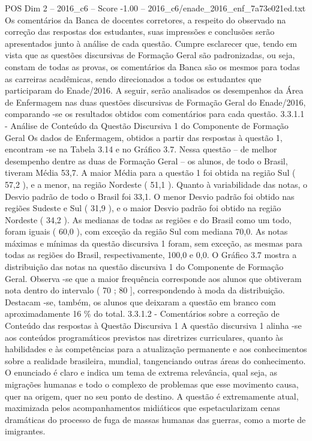 \begin{textsample}{POS Dim 2 – 2016\_c6 – Score -1.00 – 2016\_c6/enade\_2016\_enf\_7a73e021ed.txt}
Os comentários da Banca de docentes corretores, a respeito do observado na correção das respostas dos estudantes, suas impressões e conclusões serão apresentados junto à análise de cada questão.
Cumpre esclarecer que, tendo em vista que as questões discursivas de Formação Geral são padronizadas, ou seja, constam de todas as provas, os comentários da Banca são os mesmos para todas as carreiras acadêmicas, sendo direcionados a todos os estudantes que participaram do Enade/2016.
A seguir, serão analisados os desempenhos da Área de Enfermagem nas duas questões discursivas de Formação Geral do Enade/2016, comparando -se os resultados obtidos com comentários para cada questão. 3.3.1.1 - Análise de Conteúdo da Questão Discursiva 1 do Componente de Formação Geral Os dados de Enfermagem, obtidos a partir das respostas à questão 1, encontram -se na Tabela 3.14 e no Gráfico 3.7.
Nessa questão – de melhor desempenho dentre as duas de Formação Geral – os alunos, de todo o Brasil, tiveram Média 53,7.
A maior Média para a questão 1 foi obtida na região Sul ( 57,2 ), e a menor, na região Nordeste ( 51,1 ).
Quanto à variabilidade das notas, o Desvio padrão de todo o Brasil foi 33,1.
O menor Desvio padrão foi obtido nas regiões Sudeste e Sul ( 31,9 ), e o maior Desvio padrão foi obtido na região Nordeste ( 34,2 ).
As medianas de todas as regiões e do Brasil como um todo, foram iguais ( 60,0 ), com exceção da região Sul com mediana 70,0.
As notas máximas e mínimas da questão discursiva 1 foram, sem exceção, as mesmas para todas as regiões do Brasil, respectivamente, 100,0 e 0,0.
O Gráfico 3.7 mostra a distribuição das notas na questão discursiva 1 do Componente de Formação Geral.
Observa -se que a maior frequência corresponde aos alunos que obtiveram nota dentro do intervalo ( 70 ; 80 ], correspondendo à moda da distribuição.
Destacam -se, também, os alunos que deixaram a questão em branco com aproximadamente 16 \% do total. 3.3.1.2 - Comentários sobre a correção de Conteúdo das respostas à Questão Discursiva 1 A questão discursiva 1 alinha -se aos conteúdos programáticos previstos nas diretrizes curriculares, quanto às habilidades e às competências para a atualização permanente e aos conhecimentos sobre a realidade brasileira, mundial, tangenciando outras áreas do conhecimento.
O enunciado é claro e indica um tema de extrema relevância, qual seja, as migrações humanas e todo o complexo de problemas que esse movimento causa, quer na origem, quer no seu ponto de destino.
A questão é extremamente atual, maximizada pelos acompanhamentos midiáticos que espetacularizam cenas dramáticas do processo de fuga de massas humanas das guerras, como a morte de imigrantes.

\end{textsample}
